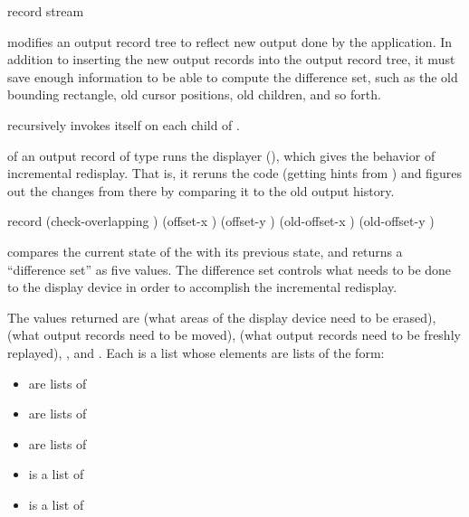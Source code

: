  {record stream}

 modifies an output record tree to reflect new
output done by the application.  In addition to inserting the new output records
into the output record tree, it must save enough information to be able to
compute the difference set, such as the old bounding rectangle, old cursor
positions, old children, and so forth.

 recursively invokes itself on each child of
.

 of an output record of type
 runs the displayer (),
which gives the behavior of incremental redisplay.  That is, it reruns the code
(getting hints from ) and figures out the changes from there
by comparing it to the old output history.


 {record \optional (check-overlapping )
                                      (offset-x ) (offset-y )
                                      (old-offset-x ) (old-offset-y )} 

 compares the current state of the   with its previous state, and returns a ``difference set''
as five values.  The difference set controls what needs to be done to the
display device in order to accomplish the incremental redisplay.

The values returned are  (what areas of the display device need to
be erased),  (what output records need to be moved), 
(what output records need to be freshly replayed), , and
.  Each is a list whose elements are lists of the form:

\begin{itemize}
\item {} are lists of 

\item {} are lists of 

\item {} are lists of 

\item {} is a list of 

\item {} is a list of 
\end{itemize}

